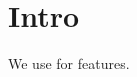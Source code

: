 \documentclass{article}
\begin{document}
\section{Intro}
We use \cite{he2016deep} for features.

\end{document}
